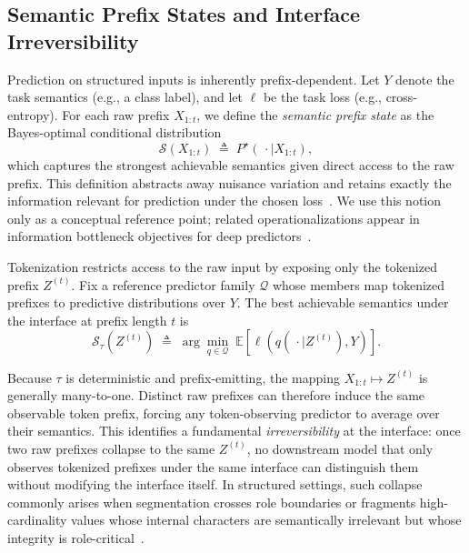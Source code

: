 \subsection{Semantic Prefix States and Interface Irreversibility}
\label{sec:semantic_state}

Prediction on structured inputs is inherently prefix-dependent.
Let $Y$ denote the task semantics (e.g., a class label), and let $\ell$ be the task loss (e.g., cross-entropy).
For each raw prefix $X_{1:t}$, we define the \emph{semantic prefix state} as the Bayes-optimal conditional distribution
\begin{equation}
\mathcal{S}(X_{1:t})
\;\triangleq\;
P^\star(\,\cdot \mid X_{1:t}),
\label{eq:semantic_raw}
\end{equation}
which captures the strongest achievable semantics given direct access to the raw prefix.
This definition abstracts away nuisance variation and retains exactly the information relevant for prediction under the chosen loss~\cite{cover1999elements,tishby2000information}.
We use this notion only as a conceptual reference point; related operationalizations appear in information bottleneck objectives for deep predictors~\cite{alemi2016deep}.

Tokenization restricts access to the raw input by exposing only the tokenized prefix $Z^{(t)}$.
Fix a reference predictor family $\mathcal{Q}$ whose members map tokenized prefixes to predictive distributions over $Y$.
The best achievable semantics under the interface at prefix length $t$ is
\begin{equation}
\mathcal{S}_\tau(Z^{(t)})
\;\triangleq\;
\arg\min_{q \in \mathcal{Q}}
\;
\mathbb{E}\!\left[\ell\!\left(q(\,\cdot \mid Z^{(t)}), Y\right)\right].
\label{eq:semantic_tok}
\end{equation}

Because $\tau$ is deterministic and prefix-emitting, the mapping $X_{1:t} \mapsto Z^{(t)}$ is generally many-to-one.
Distinct raw prefixes can therefore induce the same observable token prefix, forcing any token-observing predictor to average over their semantics.
This identifies a fundamental \emph{irreversibility} at the interface: once two raw prefixes collapse to the same $Z^{(t)}$, no downstream model that only observes tokenized prefixes under the same interface can distinguish them without modifying the interface itself.
In structured settings, such collapse commonly arises when segmentation crosses role boundaries or fragments high-cardinality values whose internal characters are semantically irrelevant but whose integrity is role-critical~\cite{yin2020tabert,herzig2020tapas}.

